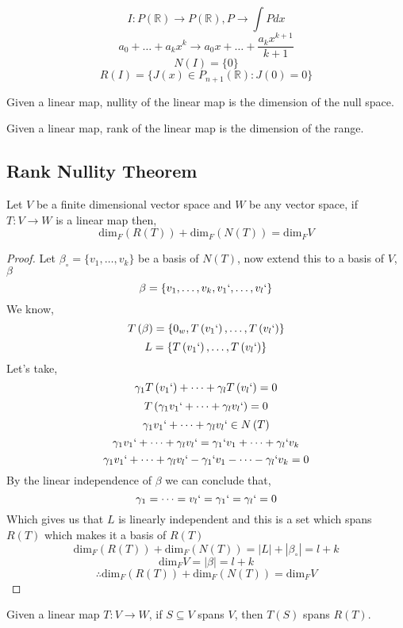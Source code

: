 \documentclass[11pt,a4paper]{colorart}
\def\l{\left}
\def\r{\right}
\def\R{\mathbb{R}}
\def\b{\beta}
\def\g{\gamma}
\begin{document}
\begin{example}[Integration]
	\[ I:P\l(\R\r) \rightarrow P\l(\R\r),P\rightarrow \int P dx \]
	\[ a_0+\dots+a_kx^k \rightarrow a_0x+\dots+\frac{a_kx^{k+1}}{k+1} \]
	\[ N\l(I\r) = \{0 \} \]
	\[ R\l(I\r) = \{J\l(x\r)\in P_{n+1}\l(\R\r):J\l(0\r)=0\} \]
\end{example}

\begin{definition}[Nullity]
	Given a linear map, nullity of the linear map is the dimension of the null space.
\end{definition}

\begin{definition}[Rank]
	Given a linear map, rank of the linear map is the dimension of the range.
\end{definition}

\subsection{Rank Nullity Theorem}

\begin{theorem}
	Let $V$ be a finite dimensional vector space and $W$ be any vector space, if $T:V\rightarrow W$ is a linear map then,
	\[ \text{dim}_F\l(R\l(T\r)\r) + \text{dim}_F\l(N\l(T\r)\r) = \text{dim}_FV \]
\end{theorem}

\begin{proof}
	Let $\b_\circ = \{v_1,\dots,v_k\}$ be a basis of $N\l(T\r)$, now extend this to a basis of $V$, $\b$  
	\[\b=\{v_1,\dots,v_k,v_1`,\dots,v_l`\} \]
	We know,
	\[ T\l(\b\r) = \{0_w,T\l(v_1`\r),\dots,T\l(v_l`\r)\} \]
	\[ L = \{T\l(v_1`\r),\dots,T\l(v_l`\r)\} \]
	Let's take,
	\[ \g_1 T\l(v_1`\r)+\dots+\g_l T\l(v_l`\r) = 0 \]
	\[ T\l(\g_1v_1`+\dots+\g_lv_l`\r)=0\]
	\[ \g_1v_1`+\dots+\g_lv_l`\in N\l(T\r) \]
	\[ \g_1v_1`+\dots+\g_lv_l` = \g_1`v_1+\dots+\g_l`v_k \]
	\[ \g_1v_1`+\dots+\g_lv_l` - \g_1`v_1-\dots-\g_l`v_k = 0 \]
	By the linear independence of $\b$ we can conclude that,
	\[ \g_1=\dots=v_l` =\g_1`=\g_l` = 0 \]
	Which gives us that $L$ is linearly independent and this is a set which spans $R\l(T\r)$ which makes it a basis of $R\l(T\r)$
	\[ \text{dim}_F\l(R\l(T\r)\r) + \text{dim}_F\l(N\l(T\r)\r) = |L| + |\b_\circ| = l + k \]
	\[ \text{dim}_FV = |\b|=l + k  \]
	\[\therefore \text{dim}_F\l(R\l(T\r)\r) + \text{dim}_F\l(N\l(T\r)\r) = \text{dim}_FV \]
\end{proof}

\begin{remark}
	Given a linear map $T:V\rightarrow W$, if $S\subseteq V$ spans $V$, then $T\l(S\r)$ spans $R\l(T\r)$.
\end{remark}
\end{document}
